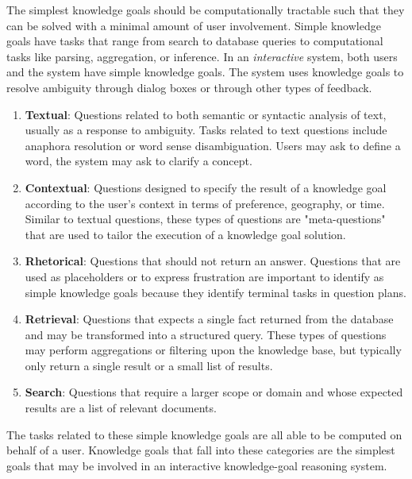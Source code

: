 \documentclass{llncs}
\begin{document}
The simplest knowledge goals should be computationally tractable such that they can be solved with a minimal amount of user involvement. Simple knowledge goals have tasks that range from search to database queries to computational tasks like parsing, aggregation, or inference. In an \textit{interactive} system, both users and the system have simple knowledge goals. The system uses knowledge goals to resolve ambiguity through dialog boxes or through other types of feedback.

\begin{enumerate}

\item \textbf{Textual}: Questions related to both semantic or syntactic analysis of text, usually as a response to ambiguity. Tasks related to text questions include anaphora resolution or word sense disambiguation. Users may ask to define a word, the system may ask to clarify a concept.

\item \textbf{Contextual}: Questions designed to specify the result of a knowledge goal according to the user's context in terms of preference, geography, or time. Similar to textual questions, these types of questions are "meta-questions" that are used to tailor the execution of a knowledge goal solution.

\item \textbf{Rhetorical}: Questions that should not return an answer. Questions that are used as placeholders or to express frustration are important to identify as simple knowledge goals because they identify terminal tasks in question plans.

\item \textbf{Retrieval}: Questions that expects a single fact returned from the database and may be transformed into a structured query. These types of questions may perform aggregations or filtering upon the knowledge base, but typically only return a single result or a small list of results.

\item \textbf{Search}: Questions that require a larger scope or domain and whose expected results are a list of relevant documents.

\end{enumerate}

The tasks related to these simple knowledge goals are all able to be computed on behalf of a user. Knowledge goals that fall into these categories are the simplest goals that may be involved in an interactive knowledge-goal reasoning system.
\end{document}
